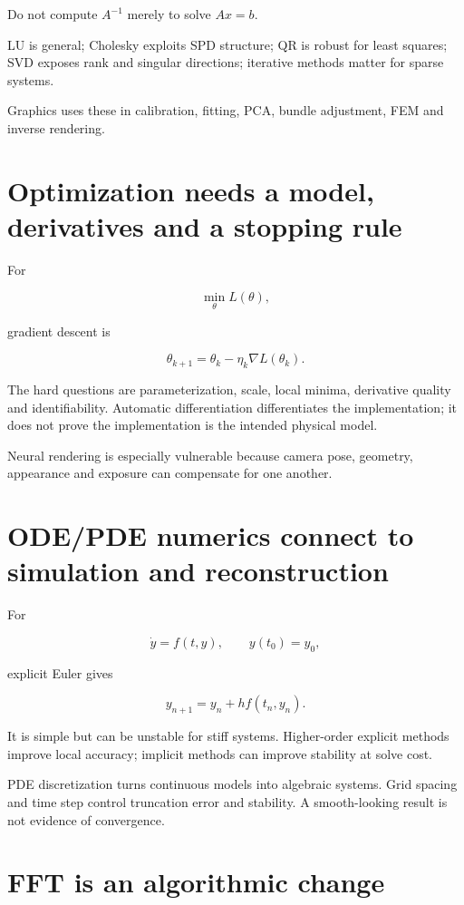 Do not compute \(A^{-1}\) merely to solve \(Ax=b\).

LU is general; Cholesky exploits SPD structure; QR is robust for least squares; SVD exposes rank and singular directions; iterative methods matter for sparse systems.

Graphics uses these in calibration, fitting, PCA, bundle adjustment, FEM and inverse rendering.

\section{Optimization needs a model, derivatives and a stopping rule}\label{01-foundations-i-ch017-optimization-needs-a-model-derivatives-and-a-stopping-rule}

For

\[
\min_\theta L(\theta),
\]

gradient descent is

\[
\theta_{k+1}=\theta_k-\eta_k\nabla L(\theta_k).
\]

The hard questions are parameterization, scale, local minima, derivative quality and identifiability. Automatic differentiation differentiates the implementation; it does not prove the implementation is the intended physical model.

Neural rendering is especially vulnerable because camera pose, geometry, appearance and exposure can compensate for one another.

\section{ODE/PDE numerics connect to simulation and reconstruction}\label{01-foundations-i-ch017-odepde-numerics-connect-to-simulation-and-reconstruction}

For

\[
\dot y=f(t,y),\qquad y(t_0)=y_0,
\]

explicit Euler gives

\[
y_{n+1}=y_n+h f(t_n,y_n).
\]

It is simple but can be unstable for stiff systems. Higher-order explicit methods improve local accuracy; implicit methods can improve stability at solve cost.

PDE discretization turns continuous models into algebraic systems. Grid spacing and time step control truncation error and stability. A smooth-looking result is not evidence of convergence.

\section{FFT is an algorithmic change}\label{01-foundations-i-ch017-fft-is-an-algorithmic-change}

